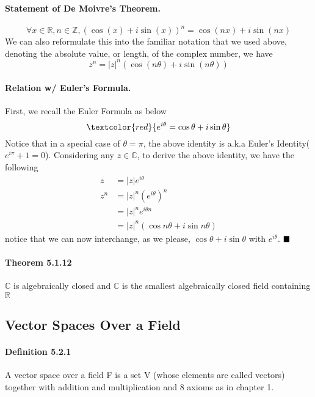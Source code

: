 \documentclass[11pt]{article}
\newcommand{\qed}[0]{$\hfill\blacksquare$}
\newcommand{\real}[0]{\mathbb{R}}
\newcommand{\mc}[0]{\mathbb{C}}
\begin{document}
{    \paragraph{Statement of De Moivre's Theorem.}
    \begin{equation*}
        \forall x\in \real, n\in \mathbb{Z}, \left(\cos(x) + i\sin(x)\right)^n = \cos(nx) + i\sin(nx)
    \end{equation*}
    We can also reformulate this into the familiar notation that we used above, denoting the absolute
    value, or length, of the complex number, we have
    \begin{equation*}
        z^n = |z|^n\left(\cos(n\theta) + i\sin(n\theta)\right)
    \end{equation*}

    \paragraph{Relation w/ Euler's Formula.} First, we recall the Euler Formula as below
    \begin{equation*}
        \textcolor{red}{e^{i\theta} = \cos \theta + i\sin \theta}
    \end{equation*}
    Notice that in a special case of $\theta = \pi$, the above identity is a.k.a Euler's 
    Identity($e^{i\pi}+1=0$). Considering any $z\in \mc$, to derive the above identity, we have the following
    \begin{align*}
    	z &= |z|e^{i\theta}\\
        z^n &= |z|^n\left(e^{i\theta}\right)^n\\
        &= |z|^ne^{i\theta n} \\
        &= |z|^n\left(\cos n\theta + i\sin n \theta\right)
    \end{align*}
    notice that we can now interchange, as we please, $\cos \theta + i\sin \theta$ with $e^{i\theta}$. \qed
\paragraph{Theorem 5.1.12} $\mc$ is algebraically closed and $\mc$ is the smallest algebraically closed field containing $\real$
\subsection{Vector Spaces Over a Field}
\paragraph{Definition 5.2.1} A vector space over a field F is a set V (whose elements are called vectors) together with addition and multiplication and 8 axioms as in chapter 1.
}
\end{document}
